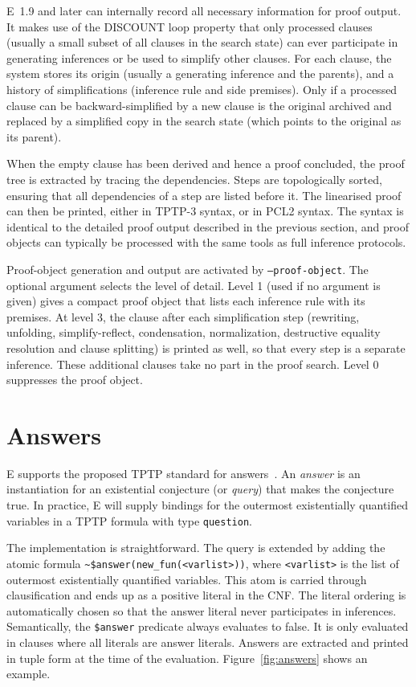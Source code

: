 \documentclass{report}
\begin{document}
E~1.9 and later can internally record all necessary information for
proof output. It makes use of the DISCOUNT loop property that only
processed clauses (usually a small subset of all clauses in the search
state) can ever participate in generating inferences or be used to
simplify other clauses. For each clause, the system stores its origin
(usually a generating inference and the parents), and a history of
simplifications (inference rule and side premises). Only if a
processed clause can be backward-simplified by a new clause is the
original archived and replaced by a simplified copy in the search
state (which points to the original as its parent).

When the empty clause has been derived and hence a proof concluded,
the proof tree is extracted by tracing the dependencies. Steps are
topologically sorted, ensuring that all dependencies of a step are
listed before it. The linearised proof can then be printed, either in
TPTP-3 syntax, or in PCL2 syntax. The syntax is identical to the
detailed proof output described in the previous section, and proof
objects can typically be processed with the same tools as full
inference protocols.

Proof-object generation and output are activated by
\texttt{--proof-object}. The optional argument selects the level of
detail. Level 1 (used if no argument is given) gives a compact proof
object that lists each inference rule with its premises. At level 3,
the clause after each simplification step (rewriting, unfolding,
simplify-reflect, condensation, normalization, destructive equality
resolution and clause splitting) is printed as well, so that every
step is a separate inference. These additional clauses take no part
in the proof search. Level 0 suppresses the proof object.


\section{Answers}

E supports the proposed TPTP standard for
answers~\cite{SSSU:TPTP-ANS}. An \emph{answer} is an instantiation for
an existential conjecture (or \emph{query}) that makes the conjecture
true. In practice, E will supply bindings for the outermost
existentially quantified variables in a TPTP formula with type
\texttt{question}.

The implementation is straightforward. The query is extended by adding
the atomic formula \verb|~$answer(new_fun(<varlist>))|, where
\verb|<varlist>| is the list of outermost existentially quantified
variables. This atom is carried through clausification and ends up as
a positive literal in the CNF. The literal ordering is automatically
chosen so that the answer literal never participates in
inferences. Semantically, the \verb|$answer| predicate always
evaluates to false. It is only evaluated in clauses where all literals
are answer literals. Answers are extracted and printed in tuple form
at the time of the evaluation. Figure~\ref{fig:answers} shows an
example.
\end{document}
